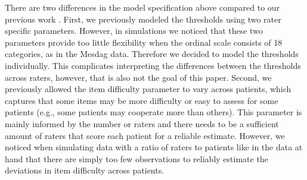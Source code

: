 \documentclass[a4paper,11pt]{article}
\newcommand{\DB}[1]{\todo[inline, color=colorDon]{DB: {#1}}}
\begin{document}
There are two differences in the model specification above compared to our previous work \parencite{vandenBergh2020cultural}.
First, we previously modeled the thresholds using two rater specific parameters.
However, in simulations we noticed that these two parameters provide too little flexibility when the ordinal scale consists of 18 categories, as in the Mesdag data.
Therefore we decided to model the thresholds individually.
This complicates interpreting the differences between the thresholds across raters, however, that is also not the goal of this paper.
Second, we previously allowed the item difficulty parameter to vary across patients, which captures that some items may be more difficulty or easy to assess for some patients (e.g., some patients may cooperate more than others).
This parameter is mainly informed by the number or raters and there needs to be a sufficient amount of raters that score each patient for a reliable estimate.
However, we noticed when simulating data with a ratio of raters to patients like in the data at hand that there are simply too few observations to reliably estimate the deviations in item difficulty across patients.


%
%
%
%
%
\end{document}
